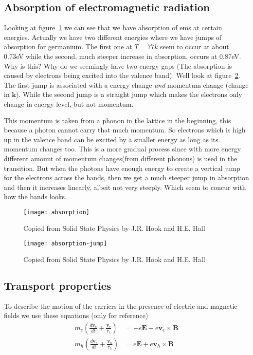 \documentclass[11pt]{article}
\begin{document}
\subsection{Absorption of electromagnetic radiation}
Looking at figure~\ref{fig:absorption} we can see that we have absorption of ems at certain energies. Actually we have two different energies where we have jumps of absorption for germanium. The first one at $T=77k$ seem to occur at about 0.73eV while the second, much steeper increase in absorption, occurs at 0.87eV. Why is this? Why do we seemingly have two energy gaps (The absorption is caused by electrons being excited into the valence band). Well look at figure~\ref{fig:absorption-jump}. The first jump is associated with a energy change \emph{and} momentum change (change in $\pmb{k}$). While the second jump is a straight jump which makes the electrons only change in energy level, but not momentum. 

This momentum is taken from a phonon in the lattice in the beginning, this because a photon cannot carry that much momentum. So electrons which is high up in the valence band can be excited by a smaller energy as long as its momentum changes too. This is a more gradual process since with more energy different amount of momentum changes(from different phonons) is used in the transition. But when the photons have enough energy to create a vertical jump for the electrons across the bands, then we get a much steeper jump in absorption and then it increases linearly, albeit not very steeply. Which seem to concur with how the bands looks.
\begin{figure}[!ht]
	\centering
	\texttt{[image: absorption]}
	\caption{Copied from Solid State Physics by J.R. Hook and H.E. Hall}
	\label{fig:absorption}
\end{figure}
\begin{figure}[!ht]
	\centering
	\texttt{[image: absorption-jump]}
	\caption{Copied from Solid State Physics by J.R. Hook and H.E. Hall}
	\label{fig:absorption-jump}
\end{figure}
\subsection{Transport properties}
To describe the motion of the carriers in the presence of electric and magnetic fields we use these equations (only for reference)
\begin{align}
	m_e (\frac{d\pmb{v}_e}{dt} + \frac{\pmb{v}_e}{\tau_e}) &= -e\pmb{E} - e\pmb{v}_e \times \pmb{B} \\
	m_h (\frac{d\pmb{v}_h}{dt} + \frac{\pmb{v}_h}{\tau_h}) &= e\pmb{E} + e\pmb{v}_h \times \pmb{B} \\
\end{align}
\end{document}

